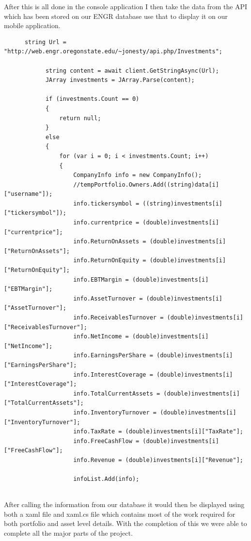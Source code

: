 \documentclass[letterpaper,10pt,titlepage,journal,compsoc,draftclsnofoot,onecolumn]{IEEEtran}
\begin{document}
After this is all done in the console application I then take the data from the API which has been stored on our ENGR database use that to display it on our mobile application.

     \begin{lstlisting} 
      string Url = "http://web.engr.oregonstate.edu/~jonesty/api.php/Investments";

            string content = await client.GetStringAsync(Url);
            JArray investments = JArray.Parse(content);

            if (investments.Count == 0)
            {
                return null;
            }
            else
            {
                for (var i = 0; i < investments.Count; i++)
                {
                    CompanyInfo info = new CompanyInfo();
                    //tempPortfolio.Owners.Add((string)data[i]["username"]);
                    info.tickersymbol = ((string)investments[i]["tickersymbol"]);
                    info.currentprice = (double)investments[i]["currentprice"];
                    info.ReturnOnAssets = (double)investments[i]["ReturnOnAssets"];
                    info.ReturnOnEquity = (double)investments[i]["ReturnOnEquity"];
                    info.EBTMargin = (double)investments[i]["EBTMargin"];
                    info.AssetTurnover = (double)investments[i]["AssetTurnover"];
                    info.ReceivablesTurnover = (double)investments[i]["ReceivablesTurnover"];
                    info.NetIncome = (double)investments[i]["NetIncome"];
                    info.EarningsPerShare = (double)investments[i]["EarningsPerShare"];
                    info.InterestCoverage = (double)investments[i]["InterestCoverage"];
                    info.TotalCurrentAssets = (double)investments[i]["TotalCurrentAssets"];
                    info.InventoryTurnover = (double)investments[i]["InventoryTurnover"];
                    info.TaxRate = (double)investments[i]["TaxRate"];
                    info.FreeCashFlow = (double)investments[i]["FreeCashFlow"];
                    info.Revenue = (double)investments[i]["Revenue"];

                    infoList.Add(info);
     
     \end{lstlisting} 
     
     After calling the information from our database it would then be displayed using both a xaml file and xaml.cs file which contains most of the work required for both portfolio and asset level details. With the completion of this we were able to complete all the major parts of the project. 
     
\end{document}
